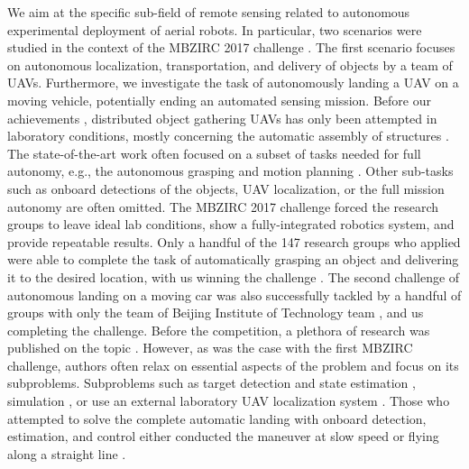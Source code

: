 \documentclass[a4paper,11pt,twoside,openright]{book}
\begin{document}
We aim at the specific sub-field of remote sensing related to autonomous experimental deployment of aerial robots.
In particular, two scenarios were studied in the context of the \ac{MBZIRC} 2017 challenge \cite{dias2019journal}.
The first scenario focuses on autonomous localization, transportation, and delivery of objects by a team of \acp{UAV}.
Furthermore, we investigate the task of autonomously landing a \ac{UAV} on a moving vehicle, potentially ending an automated sensing mission.
Before our achievements \cite{loianno2018localization, spurny2019cooperative}, distributed object gathering \acp{UAV} has only been attempted in laboratory conditions, mostly concerning the automatic assembly of structures \cite{mirjan2016building, alejo2014collisionfree, augugliaro2014flight, lindsey2013distributed}.
The state-of-the-art work often focused on a subset of tasks needed for full autonomy, e.g., the autonomous grasping \cite{gawel2017aerial, thomas2014toward} and motion planning \cite{alejo2014collisionfree}.
Other sub-tasks such as onboard detections of the objects, \ac{UAV} localization, or the full mission autonomy are often omitted.
The \ac{MBZIRC} 2017 challenge forced the research groups to leave ideal lab conditions, show a fully-integrated robotics system, and provide repeatable results.
Only a handful of the 147 research groups who applied \cite{beul2019team, bahnemann2019eth, lee2019mission, castano2019robotics} were able to complete the task of automatically grasping an object and delivering it to the desired location, with us winning the challenge \cite{spurny2019cooperative}.
The second challenge of autonomous landing on a moving car was also successfully tackled by a handful of groups \cite{beul2017fast,  li2019fast, battiato2017system, cantelli2017autonomous, jin2019ellipse} with only the team of Beijing Institute of Technology team \cite{jin2019ellipse}, and us \cite{baca2019autonomous} completing the challenge.
Before the competition, a plethora of research was published on the topic \cite{jin2016onboard}.
However, as was the case with the first \ac{MBZIRC} challenge, authors often relax on essential aspects of the problem and focus on its subproblems.
Subproblems such as target detection and state estimation \cite{benini2016real, lin2017monocular}, simulation \cite{jung2015close, jung2016target, ghommam2017autonomous}, or use an external laboratory \ac{UAV} localization system \cite{ghamry2016real, lee2012autonomous, hui2013autonomous}.
Those who attempted to solve the complete automatic landing with onboard detection, estimation, and control either conducted the maneuver at slow speed \cite{hoang2017vision} or flying along a straight line \cite{borowczyk2017autonomous}.
\end{document}
